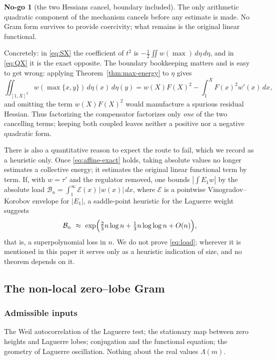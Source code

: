 \documentclass[11pt]{amsart}
\theoremstyle{definition}
\theoremstyle{remark}
\theoremstyle{definition}
\newtheorem{nogo}{No-go}[section]
\begin{document}
\begin{nogo}[the two Hessians cancel, boundary included]\label{ng:m1-global}
The only arithmetic quadratic component of the mechanism cancels before any estimate is made. No
Gram form survives to provide coercivity; what remains is the original linear functional.
\end{nogo}

\noindent Concretely: in \eqref{eq:SX} the coefficient of $t^2$ is
$-\tfrac12\iint w(\max)\,d\eta\,d\eta$, and in \eqref{eq:QX} it is the exact opposite. The
boundary bookkeeping matters and is easy to get wrong: applying
Theorem~\ref{thm:max-energy} to $\eta$ gives
\begin{equation}\label{eq:hess-boundary}
   \iint_{[1,X]^2}w(\max\{x,y\})\,d\eta(x)\,d\eta(y)
   =w(X)F(X)^2-\int_1^XF(x)^2w'(x)\,dx ,
\end{equation}
and omitting the term $w(X)F(X)^2$ would manufacture a spurious residual Hessian. Thus
factorizing the compensator factorizes only \emph{one} of the two cancelling terms; keeping both
coupled leaves neither a positive nor a negative
quadratic form.

There is also a quantitative reason to expect the route to fail, which we record as a heuristic
only. Once \eqref{eq:affine-exact} holds, taking absolute values no longer estimates a collective
energy; it estimates the original linear functional term by term. If, with $w=\tau'$ and the
regulator removed, one bounds $|\int E_1w|$ by the absolute load
$\mathcal B_n=\int_1^\infty\mathcal E(x)\,|w(x)|\,dx$, where $\mathcal E$ is a pointwise
Vinogradov--Korobov envelope for $|E_1|$, a saddle-point heuristic for the Laguerre weight
suggests
\begin{equation}\label{eq:load}
   \mathcal B_n\ \approx\ \exp\Bigl(\tfrac23n\log n+\tfrac13n\log\log n+O(n)\Bigr),
\end{equation}
that is, a superpolynomial loss in $n$. We do not prove \eqref{eq:load}; wherever it is mentioned
in this paper it serves only as a heuristic indication of size, and no theorem depends on it.

\subsection{The non-local zero--lobe Gram}\label{sec:m3}

\subsubsection*{Admissible inputs}
The Weil autocorrelation of the Laguerre test; the stationary map between zero heights and
Laguerre lobes; conjugation and the functional equation; the geometry of Laguerre oscillation.
Nothing about the real values $\Lambda(m)$.
\end{document}
